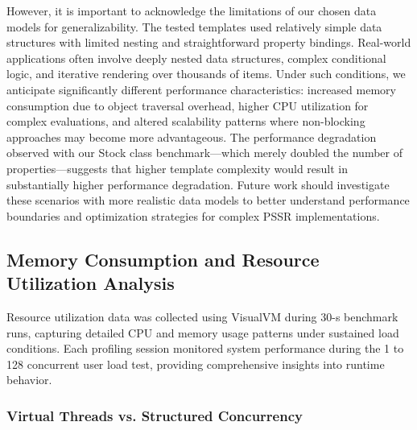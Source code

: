 \documentclass[software,article,accept,pdftex,moreauthors]{Definitions/mdpi}
\begin{document}
However, it is important to acknowledge the limitations of our chosen data
models for generalizability. The tested templates used relatively simple data
structures with limited nesting and straightforward property bindings.
Real-world applications often involve deeply nested data structures, complex
conditional logic, and iterative rendering over thousands of items. Under such
conditions, we anticipate significantly different performance characteristics:
increased memory consumption due to object traversal overhead, higher CPU
utilization for complex evaluations, and altered scalability patterns where
non-blocking approaches may become more advantageous. The performance
degradation observed with our Stock class benchmark---which merely doubled the
number of properties---suggests that higher template complexity would result in
substantially higher performance degradation. Future work should investigate
these scenarios with more realistic data models to better understand
performance boundaries and optimization strategies for complex PSSR
implementations.

\subsection{Memory Consumption and Resource Utilization Analysis}
\label{sec:memory-analysis}


Resource utilization data was collected using VisualVM during 30-s
benchmark runs, capturing detailed CPU and memory usage patterns under
sustained load conditions. Each profiling session monitored system performance
during the 1 to 128 concurrent user load test, providing comprehensive insights
into runtime behavior.

\subsubsection*{Virtual Threads vs. Structured Concurrency}
\end{document}
